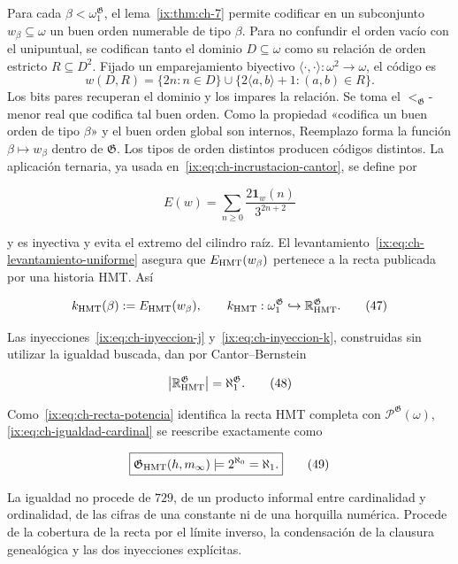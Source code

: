 Para cada \(\beta<\omega_1^{\mathfrak G}\), el lema~\ref{ix:thm:ch-7} permite codificar en un
subconjunto \(w_\beta\subseteq\omega\) un buen orden numerable de tipo
\(\beta\). Para no confundir el orden vacío con el unipuntual, se codifican
tanto el dominio \(D\subseteq\omega\) como su relación de orden estricto
\(R\subseteq D^2\). Fijado un emparejamiento biyectivo
\(\langle\cdot,\cdot\rangle:\omega^2\to\omega\), el código es
\[
 w(D,R)=\{2n:n\in D\}\cup
        \{2\langle a,b\rangle+1:(a,b)\in R\}.
\]
Los bits pares recuperan el dominio y los impares la relación. Se toma el
\(<_{\mathfrak G}\)-menor real que codifica tal buen orden. Como la propiedad
«codifica un buen orden de tipo \(\beta\)» y el buen orden global son internos,
Reemplazo forma la función \(\beta\mapsto w_\beta\) dentro de
\(\mathfrak G\). Los tipos de orden distintos producen códigos distintos. La
aplicación ternaria, ya usada en~\eqref{ix:eq:ch-incrustacion-cantor}, se define por

\[
 E(w)=\sum_{n\ge0}\frac{2\mathbf1_w(n)}{3^{2n+2}}
\tag{46}\label{ix:eq:ch-incrustacion-ternaria}
\]

y es inyectiva y evita el extremo del cilindro raíz. El levantamiento~\eqref{ix:eq:ch-levantamiento-uniforme}
asegura que \(E_{\rm HMT}(w_\beta)\) pertenece a la recta publicada por una
historia HMT. Así

\[
 k_{\rm HMT}(\beta):=E_{\rm HMT}(w_\beta),
 \qquad
 k_{\rm HMT}:\omega_1^{\mathfrak G}
 \hookrightarrow\mathbb R_{\rm HMT}^{\mathfrak G}.
\tag{47}\label{ix:eq:ch-inyeccion-k}
\]

Las inyecciones~\eqref{ix:eq:ch-inyeccion-j} y~\eqref{ix:eq:ch-inyeccion-k}, construidas sin utilizar la igualdad buscada,
dan por Cantor--Bernstein

\[
 \bigl|\mathbb R_{\rm HMT}^{\mathfrak G}\bigr|
 =\aleph_1^{\mathfrak G}.
\tag{48}\label{ix:eq:ch-igualdad-cardinal}
\]

Como~\eqref{ix:eq:ch-recta-potencia} identifica la recta HMT completa con
\(\mathcal P^{\mathfrak G}(\omega)\), \eqref{ix:eq:ch-igualdad-cardinal} se reescribe exactamente como

\[
 \boxed{
  \mathfrak G_{\rm HMT}(h,m_\infty)
  \models 2^{\aleph_0}=\aleph_1.}
\tag{49}\label{ix:eq:ch-decision}
\]

La igualdad no procede de \(729\), de un producto informal entre cardinalidad
y ordinalidad, de las cifras de una constante ni de una horquilla numérica.
Procede de la cobertura de la recta por el límite inverso, la condensación de
la clausura genealógica y las dos inyecciones explícitas.

